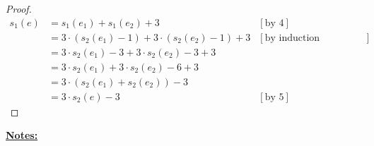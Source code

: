 \documentclass[12pt]{article}
\begin{document}
\begin{itemize}
\begin{proof}
        \bigskip

        \begin{align}
            s_1(e) &= s_1(e_1) + s_1(e_2) + 3 & [\text{by 4}]\\
            &= 3 \cdot (s_2(e_1) - 1) + 3 \cdot (s_2(e_2) - 1) + 3 & [\text{by induction hypothesis}]\\
            &= 3 \cdot s_2(e_1) - 3 + 3 \cdot s_2(e_2) - 3 + 3\\
            &= 3 \cdot s_2(e_1) + 3 \cdot s_2(e_2) - 6 + 3\\
            &= 3 \cdot ( s_2(e_1) + s_2(e_2)) - 3\\
            &= 3 \cdot s_2(e) - 3 & [\text{by 5}]
        \end{align}
    \end{proof}

\end{itemize}

\bigskip

\underline{\textbf{Notes:}}

\bigskip
\end{document}
